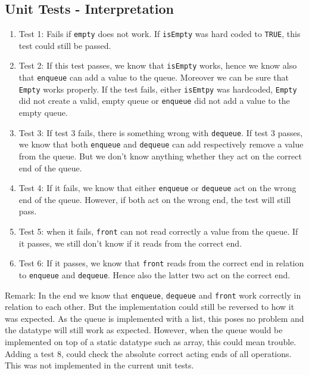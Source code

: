 \documentclass[a4paper,11pt,twoside]{article}
\begin{document}
\subsection{Unit Tests - Interpretation}
\begin{enumerate}
\item Test 1: Fails if \texttt{empty} does not work. If
  \texttt{isEmpty} was hard coded to \texttt{TRUE}, this test could
  still be passed.

\item Test 2: If this test passes, we know that \texttt{isEmpty}
  works, hence we know also that \texttt{enqueue} can add a value to
  the queue. Moreover we can be sure that \texttt{Empty} works
  properly. If the test fails, either \texttt{isEmtpy} was hardcoded,
  \texttt{Empty} did not create a valid, empty queue or
  \texttt{enqueue} did not add a value to the empty queue.

\item Test 3: If test 3 fails, there is something wrong with
  \texttt{dequeue}. If test 3 passes, we know that both
  \texttt{enqueue} and \texttt{dequeue} can add respectively remove a
  value from the queue. But we don't know anything whether they act on
  the correct end of the queue.

\item Test 4: If it fails, we know that either \texttt{enqueue} or
  \texttt{dequeue} act on the wrong end of the queue. However, if both
  act on the wrong end, the test will still pass.

\item Test 5: when it fails, \texttt{front} can not read correctly a
  value from the queue. If it passes, we still don't know if it reads from the
  correct end.

\item Test 6: If it passes, we know that \texttt{front} reads
  from the correct end in relation to \texttt{enqueue} and
  \texttt{dequeue}. Hence also the latter two act on the correct end.
\end{enumerate}

Remark: In the end we know that \texttt{enqueue}, \texttt{dequeue} and
\texttt{front} work correctly in relation to each other. But the
implementation could still be reversed to how it was expected. As
the queue is implemented with a list, this poses no problem and the
datatype will still work as expected. However, when the queue would be
implemented on top of a static datatype such as array, this could mean
trouble. Adding a test 8, could check the absolute correct acting ends
of all operations. This was not implemented in the current unit tests.
 
\end{document}
